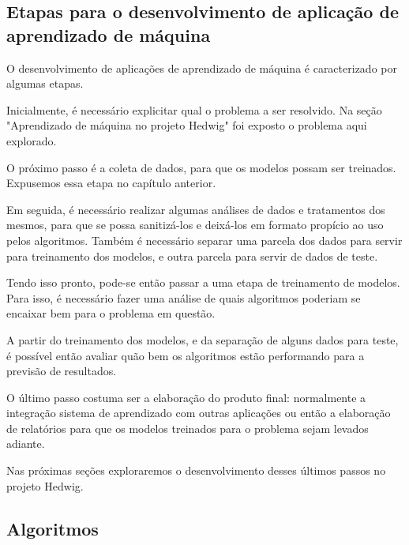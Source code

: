 		\subsection{Etapas para o desenvolvimento de aplicação de aprendizado de máquina}


			O desenvolvimento de aplicações de aprendizado de máquina é caracterizado por algumas etapas.

			Inicialmente, é necessário explicitar qual o problema a ser resolvido. Na seção "Aprendizado de máquina no projeto Hedwig" foi exposto o problema aqui explorado.

			O próximo passo é a coleta de dados, para que os modelos possam ser treinados. Expusemos essa etapa no capítulo anterior.

			Em seguida, é necessário realizar algumas análises de dados e tratamentos dos mesmos, para que se possa sanitizá-los e deixá-los em formato propício ao uso pelos algoritmos. Também é necessário separar uma parcela dos dados para servir para treinamento dos modelos, e outra parcela para servir de dados de teste.

			Tendo isso pronto, pode-se então passar a uma etapa de treinamento de modelos. Para isso, é necessário fazer uma análise de quais algoritmos poderiam se encaixar bem para o problema em questão.

			A partir do treinamento dos modelos, e da separação de alguns dados para teste, é possível então avaliar quão bem os algoritmos estão performando para a previsão de resultados.

			O último passo costuma ser a elaboração do produto final: normalmente a integração sistema de aprendizado com outras aplicações ou então a elaboração de relatórios para que os modelos treinados para o problema sejam levados adiante.

			Nas próximas seções exploraremos o desenvolvimento desses últimos passos no projeto Hedwig.

		\subsection{Algoritmos}

